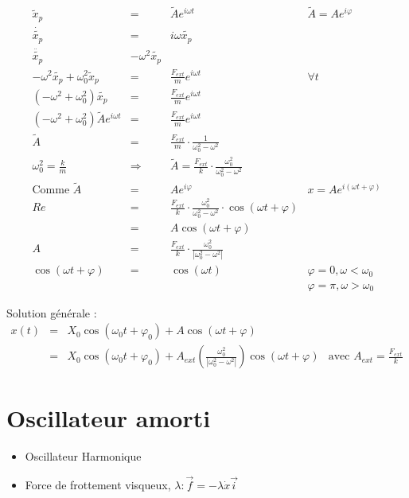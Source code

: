 \[\begin{array}{rccl}
		\tilde{x}_p &=& \tilde{A}e^{i\omega t} &\tilde{A} = A e^{i\varphi} \\
		\dot{\tilde{x_p}} &=& i \omega \tilde{x_p} \\
		\ddot{\tilde{x_p}} & -\omega^2 \tilde{x_p} \\
		-\omega^2 \tilde{x_p}+\omega_0^2\tilde{x}_p &=& \frac{F_{ext}}{m}e^{i\omega t} & \forall t \\
		(-\omega^2 + \omega_0^2)\tilde{x_p} &=& \frac{F_{ext}}{m} e^{i\omega t} \\
		(-\omega^2 + \omega_0^2) \tilde{A}e^{i\omega t} &=& \frac{F_{ext}}{m}e^{i\omega t} \\
		\tilde{A} &=& \frac{F_{ext}}{m} \cdot \frac{1}{\omega_0^2 - \omega^2} \\
		\omega_0^2 = \frac{k}{m} & \Rightarrow & \tilde{A} = \frac{F_{ext}}{k}\cdot \frac{\omega_0^2}{\omega_0^2 - \omega^2} \\
		\text{Comme } \tilde{A} &=& Ae^{i\varphi} &  x = Ae^{i(\omega t + \varphi)}\\
		Re &=& \frac{F_{ext}}{k} \cdot \frac{\omega_0^2}{\omega_0^2 - \omega^2} \cdot \cos(\omega t + \varphi)\\
		   &=& A \cos(\omega t + \varphi) \\
		A &=&\frac{F_{ext}}{k} \cdot \frac{\omega_0^2}{|\omega_0^2 - \omega^2|} \\
		\cos(\omega t + \varphi) &=& \cos(\omega t) & \varphi = 0, \omega < \omega_0 \\
																					   &&& \varphi = \pi, \omega > \omega_0 \end{array}\]

		Solution générale :
		\[\begin{array}{rclr}
				x(t) &=& X_0\cos(\omega_0 t + \varphi_0) + A\cos(\omega t + \varphi) \\
						   &=& X_0\cos(\omega_0 t + \varphi_0) + A_{ext}(\frac{\omega_0^2}{|\omega_0^2 - \omega^2|}) \cos(\omega t + \varphi)& \text{avec } A_{ext} = \frac{F_{ext}}{k}
			\end{array}\]

	\section{Oscillateur amorti}

	\begin{itemize}
		\item Oscillateur Harmonique
		\item Force de frottement visqueux, $\lambda : \vec{f} = - \lambda \dot{x}\vec{i}$
	\end{itemize}


